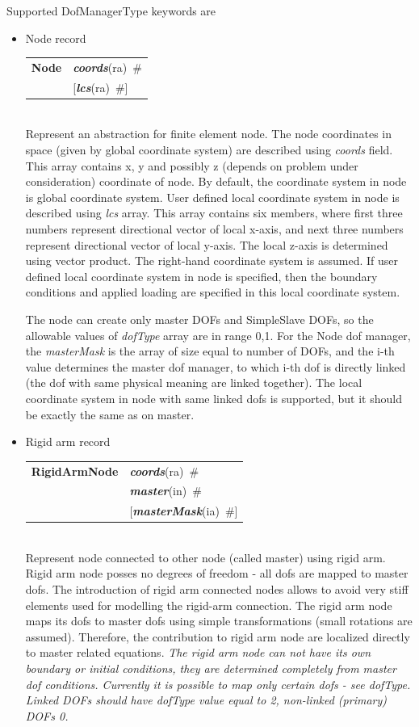 \documentclass[a4paper]{article}
\makeatletter
\newcommand{\param}[1]{{\em #1}}
\newcommand{\keywordnotype}[1]{\mbox{{\it{\bf{#1}}}}}
\newcommand{\keyword}[2]{\mbox{{\keywordnotype{#1}\tiny (#2)}}}
\newcommand{\entKeywordInst}[1]{\mbox{{\bf{{#1}}}}}
\newcommand{\field}[2]{\mbox{\keyword{#1}{#2}~\#}}
\newcommand{\optField}[2]{\mbox{[\field{#1}{#2}]}}
\newenvironment{record}[1][]{\begin{tabular}{|ll}}{\end{tabular}\\}
\newcommand{\recentry}[2]{{#1}&{#2}\\}
\newcounter{rcc}
\newenvironment{record}[1][\textwidth]{\setcounter{rcc}{0}\begin{tabular*}{#1}{|ll@{\extracolsep{\fill}}r}}{\end{tabular*}\\}
\newcommand{\recentry}[2]{\ifthenelse{\value{rcc}>0}{&$\backslash$ \\}{\setcounter{rcc}{1}}{#1}&{#2}}
\makeatother
\begin{document}
Supported DofManagerType keywords are
\begin{itemize}
\item Node record

  \begin{record}[0.9\textwidth]
    \recentry{\entKeywordInst{Node}}{\field{coords}{ra}}
    \recentry{}{[\field{lcs}{ra}]}
  \end{record}
  Represent an abstraction for finite element node.
The node
coordinates in space (given by global coordinate system) are described
using \param{coords} field. This array contains x, y and possibly z
(depends on problem under consideration) coordinate of node. 
By default, the coordinate system in node is global coordinate system.
User defined local coordinate system in node is described using \param{lcs} array. This
array contains six members, where first three numbers represent
directional vector of local x-axis, and next three numbers represent
directional vector of local y-axis. The local z-axis is determined
using vector product. The right-hand coordinate system is assumed.
If user defined local coordinate system in node is specified, then the
 boundary conditions and applied loading are specified in this local coordinate system. 

The node can create only master DOFs and SimpleSlave DOFs, so the
allowable values of \param{dofType} array are in range {0,1}.
For the Node dof manager, the \param{masterMask} is the array of size
equal to number of DOFs, and the i-th value determines the
master dof manager, to which i-th dof is directly linked (the dof with
same physical meaning are linked together).
The local coordinate
system in node with same linked dofs is supported, but it should be exactly the
same as on master. 


\item Rigid arm record

  \begin{record}[0.9\textwidth]
    \recentry{\entKeywordInst{RigidArmNode}}{\field{coords}{ra}}
    \recentry{}{\field{master}{in}} \recentry{}{\optField{masterMask}{ia}}
  \end{record}
  Represent node connected to other node (called master) using rigid
arm. Rigid arm node posses no degrees of freedom	- all dofs are mapped to master
dofs. The introduction of rigid arm connected nodes allows to avoid very
stiff elements used for modelling the rigid-arm connection. 
The rigid
arm node maps its dofs to master dofs using simple transformations
(small rotations are assumed). Therefore, the contribution to rigid
arm node are localized directly to master related equations. 
{\em The rigid arm node can not have its own boundary or initial conditions, they are
determined completely from master dof conditions. Currently it is 
possible to map only certain dofs - see \param{dofType}. Linked DOFs
should have dofType value equal to 2, non-linked (primary) DOFs 0.} 


\end{itemize}
\end{document}
